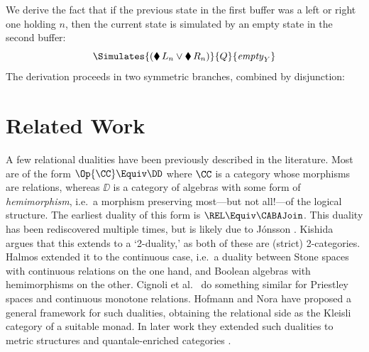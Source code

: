 \documentclass[10pt,a4paper]{article}
\begin{document}
We derive the fact that if the previous state in the first buffer was a left or right one holding $n$, then the current state is simulated by an empty state in the second buffer:
\[
  \Simulates{(\blacklozenge\, L_n \lor \blacklozenge\, R_n)}{Q}{\mathit{empty}_Y}
\]
The derivation proceeds in two symmetric branches, combined by disjunction:
\begin{mathpar}
\end{mathpar}

\section{Related Work}\label{section:related-work}

A few relational dualities have been previously described in the literature.
Most are of the form $\Op{\CC} \Equiv \DD$ where $\CC$ is a category whose
morphisms are relations, whereas $\DD$ is a category of algebras with some form
of \emph{hemimorphism}, i.e.\ a morphism preserving most---but not all!---of
the logical structure. The earliest duality of this form is $\REL \Equiv \CABAJoin$.
This duality has been rediscovered multiple times, but is likely due to
J\'{o}nsson \cite{jonsson_1951}. Kishida \cite[\S 2.3]{kishida_2018} argues that
this extends to a `2-duality,' as both of these are (strict) 2-categories.
Halmos \cite{halmos_1956} extended it to the continuous case, i.e.\ a duality
between Stone spaces with continuous relations on the one hand, and Boolean
algebras with hemimorphisms on the other. Cignoli et al.\ \cite{cignoli_1991} do
something similar for Priestley spaces and continuous monotone relations. Hofmann
and Nora \cite{hofmann_2015} have proposed a general framework for such
dualities, obtaining the relational side as the Kleisli category of a suitable
monad. In later work they extended such dualities to metric structures and
quantale-enriched categories \cite{hofmann_2023}.
\end{document}
